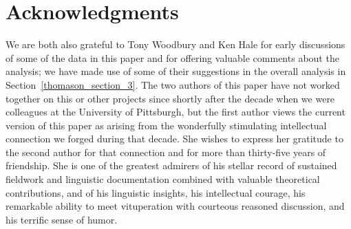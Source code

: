 \documentclass[output=paper,colorlinks,citecolor=brown]{langscibook}
\begin{document}
\section*{Acknowledgments}


   We are both also grateful to Tony Woodbury and {\dag}Ken Hale for
   early discussions of some of the data in this paper and for
   offering valuable comments about the analysis; we have made use of
   some of their suggestions in the overall analysis in Section~\ref{thomason_section_3}.  The
   two authors of this paper have not worked together on this or
   other projects since shortly after the decade when we were
   colleagues at the University of Pittsburgh, but the first author
   views the current version of this paper as arising from the
   wonderfully stimulating intellectual connection we forged during
   that decade.  She wishes to express her gratitude to the second
   author for that connection and for more than thirty-five years of
   friendship.  She is one of the greatest admirers of his stellar
   record of sustained fieldwork and linguistic documentation
   combined with valuable theoretical contributions, and of his
   linguistic insights, his intellectual courage, his remarkable
   ability to meet vituperation with courteous reasoned discussion,
   and his terrific sense of humor.



\sloppy
\printbibliography[heading=subbibliography,notkeyword=this]
\end{document}
